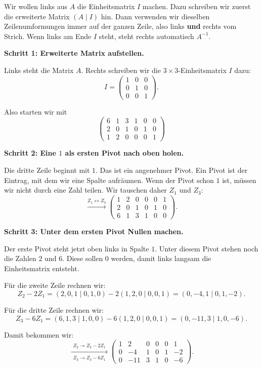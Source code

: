 \documentclass[a4paper,12pt]{article}
\begin{document}
\begin{wastun}
Wir wollen links aus $A$ die Einheitsmatrix $I$ machen.
Dazu schreiben wir zuerst die erweiterte Matrix $(A\mid I)$ hin.
Dann verwenden wir dieselben Zeilenumformungen immer auf der ganzen Zeile, also links \textbf{und} rechts vom Strich.
Wenn links am Ende $I$ steht, steht rechts automatisch $A^{-1}$.
\end{wastun}

\textbf{Schritt 1: Erweiterte Matrix aufstellen.}

Links steht die Matrix $A$.
Rechts schreiben wir die $3\times 3$-Einheitsmatrix $I$ dazu:
\[
I=
\begin{pmatrix}
1 & 0 & 0\\
0 & 1 & 0\\
0 & 0 & 1
\end{pmatrix}.
\]

Also starten wir mit
\[
\left(\begin{array}{ccc|ccc}
6 & 1 & 3 & 1 & 0 & 0 \\
2 & 0 & 1 & 0 & 1 & 0 \\
1 & 2 & 0 & 0 & 0 & 1
\end{array}\right)
\]

\textbf{Schritt 2: Eine $1$ als ersten Pivot nach oben holen.}

Die dritte Zeile beginnt mit $1$. Das ist ein angenehmer Pivot.
Ein Pivot ist der Eintrag, mit dem wir eine Spalte aufr\"aumen.
Wenn der Pivot schon $1$ ist, m\"ussen wir nicht durch eine Zahl teilen.
Wir tauschen daher $Z_1$ und $Z_3$:
\[
\xrightarrow{Z_1\leftrightarrow Z_3}
\left(\begin{array}{ccc|ccc}
1 & 2 & 0 & 0 & 0 & 1 \\
2 & 0 & 1 & 0 & 1 & 0 \\
6 & 1 & 3 & 1 & 0 & 0
\end{array}\right).
\]

\textbf{Schritt 3: Unter dem ersten Pivot Nullen machen.}

Der erste Pivot steht jetzt oben links in Spalte $1$.
Unter diesem Pivot stehen noch die Zahlen $2$ und $6$.
Diese sollen $0$ werden, damit links langsam die Einheitsmatrix entsteht.

F\"ur die zweite Zeile rechnen wir:
\[
Z_2-2Z_1
=
(2,0,1\mid 0,1,0)-2(1,2,0\mid 0,0,1)
=
(0,-4,1\mid 0,1,-2).
\]

F\"ur die dritte Zeile rechnen wir:
\[
Z_3-6Z_1
=
(6,1,3\mid 1,0,0)-6(1,2,0\mid 0,0,1)
=
(0,-11,3\mid 1,0,-6).
\]

Damit bekommen wir:
\[
\xrightarrow[\substack{Z_3\to Z_3-6Z_1}]{Z_2\to Z_2-2Z_1}
\left(\begin{array}{ccc|ccc}
1 & 2 & 0 & 0 & 0 & 1 \\
0 & -4 & 1 & 0 & 1 & -2 \\
0 & -11 & 3 & 1 & 0 & -6
\end{array}\right).
\]
\end{document}
